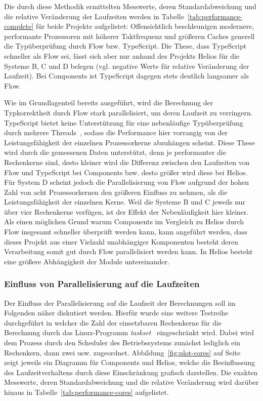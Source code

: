 Die durch diese Methodik ermittelten Messwerte, deren Standardabweichung und die relative Veränderung der Laufzeiten werden in Tabelle~\ref{tab:performance-complete} für beide Projekte aufgelistet: Offensichtlich beschleunigen modernere, performante Prozessoren mit höherer Taktfrequenz und größeren Caches generell die Typüberprüfung durch Flow bzw. TypeScript. Die These, dass TypeScript schneller als Flow sei, lässt sich aber nur anhand des Projekts Helios für die Systeme B, C und D belegen (vgl. negative Werte für relative Veränderung der Laufzeit). Bei Components ist TypeScript dagegen stets deutlich langsamer als Flow.

\medbreak


Wie im Grundlagenteil bereits ausgeführt, wird die Berechnung der Typkorrektheit durch Flow stark parallelisiert, um deren Laufzeit zu verringern. TypeScript bietet keine Unterstützung für eine nebenläufige Typüberprüfung durch mehrere Threads~\autocite{TS:NO_MULTICORE}, sodass die Performance hier vorrangig von der Leistungsfähigkeit der einzelnen Prozessorkerne abzuhängen scheint. Diese These wird durch die gemessenen Daten unterstützt, denn je performanter die Rechenkerne sind, desto kleiner wird die Differenz zwischen den Laufzeiten von Flow und TypeScript bei Components bzw. desto größer wird diese bei Helios.
Für System D scheint jedoch die Parallelisierung von Flow aufgrund der hohen Zahl von acht Prozessorkernen den größeren Einfluss zu nehmen, als die Leistungsfähigkeit der einzelnen Kerne. Weil die Systeme B und C jeweils nur über vier Rechenkerne verfügen, ist der Effekt der Nebenläufigkeit hier kleiner. Als einen möglichen Grund warum Components im Vergleich zu Helios durch Flow insgesamt schneller überprüft werden kann, kann angeführt werden, dass dieses Projekt aus einer Vielzahl unabhängiger Komponenten besteht deren Verarbeitung somit gut durch Flow parallelisiert werden kann. In Helios besteht eine größere Abhängigkeit der Module untereinander.

\subsubsection{Einfluss von Parallelisierung auf die Laufzeiten}

Der Einfluss der Parallelisierung auf die Laufzeit der Berechnungen soll im Folgenden näher diskutiert werden. Hierfür wurde eine weitere Testreihe durchgeführt in welcher die Zahl der einsetzbaren Rechenkerne für die Berechnung durch das Linux-Programm \textit{taskset}~\autocite{TASKSET} eingeschränkt wird. Dabei wird dem Prozess durch den Scheduler des Betriebssystems zunächst lediglich ein Rechenkern, dann zwei usw. zugeordnet. Abbildung~\ref{fig:plot-cores} auf Seite~\pageref{fig:plot-cores} zeigt jeweils ein Diagramm für Components und Helios, welche die Beeinflussung des Laufzeitverhaltens durch diese Einschränkung grafisch darstellen. Die exakten Messwerte, deren Standardabweichung und die relative Veränderung wird darüber hinaus in Tabelle~\ref{tab:performance-cores} aufgelistet.

